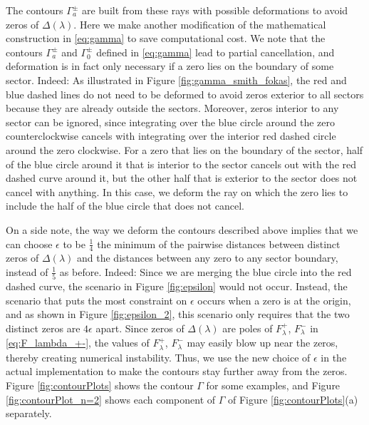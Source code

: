 \documentclass[12pt, oneside, a4paper]{article}
\begin{document}
The contours $\Gamma_a^\pm$ are built from these rays with possible deformations to avoid zeros of $\Delta(\lambda)$. Here we make another modification of the mathematical construction in \eqref{eq:gamma} to save computational cost. We note that the contours $\Gamma_a^\pm$ and $\Gamma_0^\pm$ defined in \eqref{eq:gamma} lead to partial cancellation, and deformation is in fact only necessary if a zero lies on the boundary of some sector. Indeed: As illustrated in Figure \ref{fig:gamma_smith_fokas}, the red and blue dashed lines do not need to be deformed to avoid zeros exterior to all sectors because they are already outside the sectors. Moreover, zeros interior to any sector can be ignored, since integrating over the blue circle around the zero counterclockwise cancels with integrating over the interior red dashed circle around the zero clockwise. For a zero that lies on the boundary of the sector, half of the blue circle around it that is interior to the sector cancels out with the red dashed curve around it, but the other half that is exterior to the sector does not cancel with anything. In this case, we deform the ray on which the zero lies to include the half of the blue circle that does not cancel. 

On a side note, the way we deform the contours described above implies that we can choose $\epsilon$ to be $\frac{1}{4}$ the minimum of the pairwise distances between distinct zeros of $\Delta(\lambda)$ and the distances between any zero to any sector boundary, instead of $\frac{1}{5}$ as before. Indeed: Since we are merging the blue circle into the red dashed curve, the scenario in Figure \ref{fig:epsilon} would not occur. Instead, the scenario that puts the most constraint on $\epsilon$ occurs when a zero is at the origin, and as shown in Figure \ref{fig:epsilon_2}, this scenario only requires that the two distinct zeros are $4\epsilon$ apart. Since zeros of $\Delta(\lambda)$ are poles of $F_\lambda^+$, $F_\lambda^-$ in \eqref{eq:F_lambda_+-}, the values of $F_\lambda^+$, $F_\lambda^-$ may easily blow up near the zeros, thereby creating numerical instability. Thus, we use the new choice of $\epsilon$ in the actual implementation to make the contours stay further away from the zeros. Figure \ref{fig:contourPlots} shows the contour $\Gamma$ for some examples, and Figure \ref{fig:contourPlot_n=2} shows each component of $\Gamma$ of Figure \ref{fig:contourPlots}(a) separately.
\end{document}
